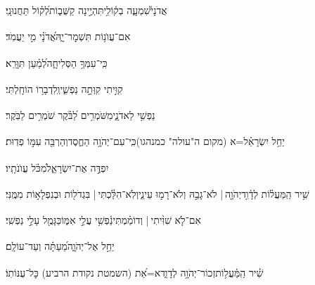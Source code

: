 \documentclass[12pt]{article}
\newcommand{\loc}[1]{\textsuperscript{\locf{#1}}}
\begin{document}
{\loc{ ב}~}‏אֲדֹנָי֮{\hfill}שִׁמְעָ֢ה בְק֫וֹלִ֥י\newline\hspace*{.5em}תִּהְיֶ֣ינָה  קַשֻּׁב֑וֹת{\hfill}לְ֝ק֗וֹל תַּחֲנוּנָֽי׃\par

{\loc{ ג}~}‏אִם־עֲוֺנ֥וֹת תִּשְׁמׇר־יָ֑הּ{\hfill}אֲ֝דֹנָ֗י מִ֣י יַעֲמֹֽד׃\par

{\loc{ ד}~}‏כִּֽי־עִמְּךָ֥ הַסְּלִיחָ֑ה{\hfill}לְ֝מַ֗עַן תִּוָּרֵֽא׃\par

{\loc{ ה}~}‏קִוִּ֣יתִי  קִוְּתָ֣ה נַפְשִׁ֑י{\hfill}וְֽלִדְבָר֥וֹ הוֹחָֽלְתִּי׃\par

{\loc{ ו}~}‏נַפְשִׁ֥י לַאדֹנָ֑י{\hfill}מִשֹּׁמְרִ֥ים לַ֝בֹּ֗קֶר שֹׁמְרִ֥ים לַבֹּֽקֶר׃\par

{\loc{ ז}~}‏יַחֵ֥ל יִשְׂרָאֵ֗ל{\hfill}=א (מקום ה"עולה" כמנהגו)\newline\hspace*{.5em}כִּֽי־עִם־יְהֹוָ֥ה הַחֶ֑סֶד{\hfill}וְהַרְבֵּ֖ה עִמּ֣וֹ פְדֽוּת׃\par

{\loc{ ח}~}‏ יִפְדֶּ֣ה אֶת־יִשְׂרָאֵ֑ל{\hfill}מִ֝כֹּ֗ל עֲוֺנֹתָֽיו׃\par\pend

\pstart[\subsection*{\textcolor{red}{פרק קלא}}]\label{פרק קלא}
{\loc{ א}~}‏שִׁ֥יר הַֽמַּעֲל֗וֹת לְדָ֫וִ֥ד\newline\hspace*{.5em}יְהֹוָ֤ה |  לֹא־גָבַ֣הּ {\hfill}וְלֹא־רָמ֣וּ עֵינַ֑י\newline\hspace*{.5em}וְלֹֽא־הִלַּ֓כְתִּי | {\hfill}בִּגְדֹל֖וֹת וּבְנִפְלָא֣וֹת מִמֶּֽנִּי׃\par

{\loc{ ב}~}‏אִם־לֹ֤א שִׁוִּ֨יתִי |  וְדוֹמַ֗מְתִּי{\hfill}נַ֫פְשִׁ֥י\newline\hspace*{.5em} עֲלֵ֣י אִמּ֑וֹ{\hfill}כַּגָּמֻ֖ל עָלַ֣י נַפְשִֽׁי׃\par

{\loc{ ג}~}‏יַחֵ֣ל  אֶל־יְהֹוָ֑ה{\hfill}מֵ֝עַתָּ֗ה וְעַד־עוֹלָֽם׃\par\pend
\ledpb
\pstart[\subsection*{\textcolor{red}{פרק קלב}}]\label{פרק קלב}
{\loc{ א}~}‏שִׁ֗יר הַֽמַּ֫עֲל֥וֹת\newline\hspace*{.5em}זְכוֹר־יְהֹוָ֥ה לְדָוִ֑ד{\hfill}א=אֵ֝ת (השמטת נקודת הרביע) כׇּל־עֻנּוֹתֽוֹ׃\par
\end{document}
